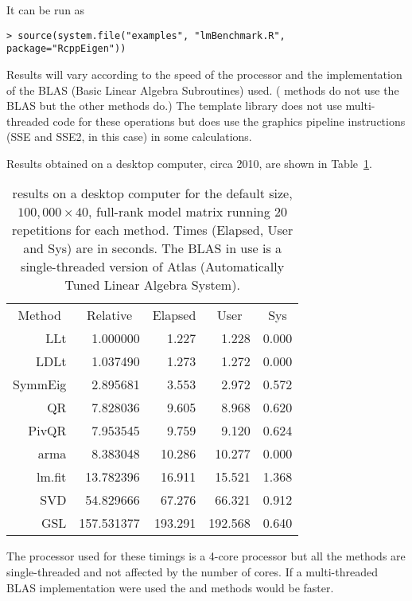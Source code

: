 \documentclass[shortnames,article]{jss}
\begin{document}
It can be run as
\begin{verbatim}
> source(system.file("examples", "lmBenchmark.R", package="RcppEigen"))
\end{verbatim}
Results will vary according to the speed of the processor and the
implementation of the BLAS (Basic Linear Algebra Subroutines) used.
( methods do not use the BLAS but the other methods do.)
The  template library does not use multi-threaded code for
these operations but does use the graphics pipeline instructions (SSE
and SSE2, in this case) in some calculations. 

Results obtained on a desktop computer, circa 2010, are shown in
Table~\ref{tab:lmRes}.
\begin{table}[tb]
  \caption{ results on a desktop computer for the
    default size, $100,000\times 40$, full-rank model matrix running
    20 repetitions for each method.  Times (Elapsed, User and Sys) are
    in seconds.  The BLAS in use is a single-threaded version of Atlas
    (Automatically Tuned Linear Algebra System).}
  \label{tab:lmRes}
  \centering
  \begin{tabular}{r r r r r}
    \toprule
    \multicolumn{1}{c}{Method} & \multicolumn{1}{c}{Relative} &
    \multicolumn{1}{c}{Elapsed} & \multicolumn{1}{c}{User} &
    \multicolumn{1}{c}{Sys}\\
    \cmidrule(r){2-5}   %
     LLt &   1.000000 &   1.227 &     1.228 &    0.000 \\
    LDLt &   1.037490 &   1.273 &     1.272 &    0.000 \\
 SymmEig &   2.895681 &   3.553 &     2.972 &    0.572 \\
      QR &   7.828036 &   9.605 &     8.968 &    0.620 \\
   PivQR &   7.953545 &   9.759 &     9.120 &    0.624 \\
    arma &   8.383048 &  10.286 &    10.277 &    0.000 \\
  lm.fit &  13.782396 &  16.911 &    15.521 &    1.368 \\
     SVD &  54.829666 &  67.276 &    66.321 &    0.912 \\
     GSL & 157.531377 & 193.291 &   192.568 &    0.640 \\
     \bottomrule
  \end{tabular}
\end{table}
The processor used for these timings is a 4-core processor but all the
methods are single-threaded and not affected by the number of cores.
If a multi-threaded BLAS implementation were used the  and
 methods would be faster.
\end{document}
